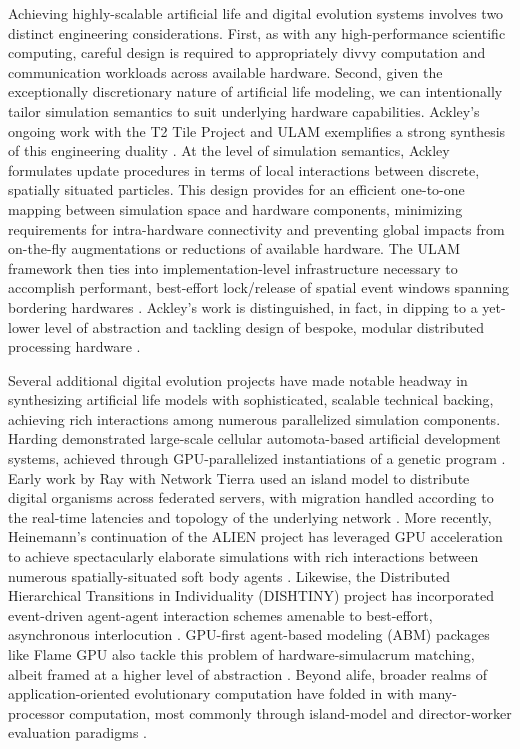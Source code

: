 Achieving highly-scalable artificial life and digital evolution systems involves two distinct engineering considerations.
First, as with any high-performance scientific computing, careful design is required to appropriately divvy computation and communication workloads across available hardware.
Second, given the exceptionally discretionary nature of artificial life modeling, we can intentionally tailor simulation semantics to suit underlying hardware capabilities.
Ackley's ongoing work with the T2 Tile Project and ULAM exemplifies a strong synthesis of this engineering duality \citep{ackley2016ulam}.
At the level of simulation semantics, Ackley formulates update procedures in terms of local interactions between discrete, spatially situated particles.
This design provides for an efficient one-to-one mapping between simulation space and hardware components, minimizing requirements for intra-hardware connectivity and preventing global impacts from on-the-fly augmentations or reductions of available hardware.
The ULAM framework then ties into implementation-level infrastructure necessary to accomplish performant, best-effort lock/release of spatial event windows spanning bordering hardwares \citep{ackley2013movable}.
Ackley's work is distinguished, in fact, in dipping to a yet-lower level of abstraction and tackling design of bespoke, modular distributed processing hardware \citep{ackley2011homeostatic,ackley2023robust,livingcomputationSFBSanta}.

Several additional digital evolution projects have made notable headway in synthesizing artificial life models with sophisticated, scalable technical backing, achieving rich interactions among numerous parallelized simulation components.
Harding demonstrated large-scale cellular automota-based artificial development systems, achieved through GPU-parallelized instantiations of a genetic program  \citep{harding2007fast_ieee}.
Early work by Ray with Network Tierra used an island model to distribute digital organisms across federated servers, with migration handled according to the real-time latencies and topology of the underlying network \citep{ray1995proposal}.
More recently, Heinemann's continuation of the ALIEN project has leveraged GPU acceleration to achieve spectacularly elaborate simulations with rich interactions between numerous spatially-situated soft body agents \citep{heinemann2008artificial}.
Likewise, the Distributed Hierarchical Transitions in Individuality (DISHTINY) project has incorporated event-driven agent-agent interaction schemes amenable to best-effort, asynchronous interlocution \citep{moreno2022exploring,moreno2021conduit}.
GPU-first agent-based modeling (ABM) packages like Flame GPU also tackle this problem of hardware-simulacrum matching, albeit framed at a higher level of abstraction \citep{richmond2010high}.
Beyond alife, broader realms of application-oriented evolutionary computation have folded in with many-processor computation, most commonly through island-model and director-worker evaluation paradigms \citep{abdelhafez2019performance,cantu2001master}.

